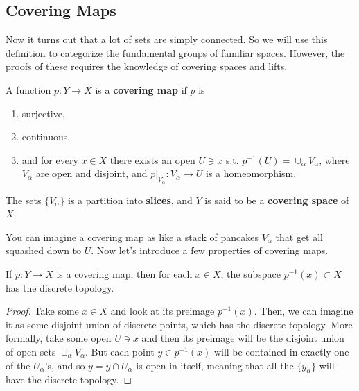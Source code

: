 \subsection{Covering Maps}

  Now it turns out that a lot of sets are simply connected. So we will use this definition to categorize the fundamental groups of familiar spaces. However, the proofs of these requires the knowledge of covering spaces and lifts.  

  \begin{definition}
    A function $p: Y \to X$ is a \textbf{covering map} if $p$ is 
    \begin{enumerate}
      \item surjective, 
      \item continuous, 
      \item and for every $x \in X$ there exists an open $U \ni x$ s.t. $p^{-1} (U) = \cup_\alpha V_\alpha$, where $V_\alpha$ are open and disjoint, and $p |_{V_\alpha}: V_\alpha \to U$ is a homeomorphism. 
    \end{enumerate}
    The sets $\{V_\alpha\}$ is a partition into \textbf{slices}, and $Y$ is said to be a \textbf{covering space} of $X$. 
  \end{definition}

  You can imagine a covering map as like a stack of pancakes $V_\alpha$ that get all squashed down to $U$. Now let's introduce a few properties of covering maps. 

  \begin{lemma}
    If $p: Y \to X$ is a covering map, then for each $x \in X$, the subspace $p^{-1} (x) \subset X$ has the discrete topology. 
  \end{lemma}
  \begin{proof}
    Take some $x \in X$ and look at its preimage $p^{-1}(x)$. Then, we can imagine it as some disjoint union of discrete points, which has the discrete topology. More formally, take some open $U \ni x$ and then its preimage will be the disjoint union of open sets $\sqcup_\alpha V_\alpha$. But each point $y \in p^{-1} (x)$ will be contained in exactly one of the $U_\alpha$'s, and so $y = y \cap U_\alpha$ is open in itself, meaning that all the $\{y_\alpha\}$ will have the discrete topology. 
  \end{proof} 


